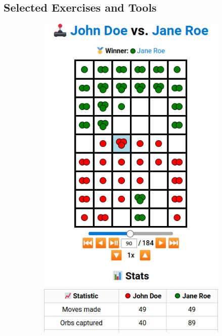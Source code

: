 \subsection{Selected Exercises and Tools}\label{sec:selected_exercises}


\begin{figure}[t!]

\centering
\begin{subfigure}[t]{0.3\textwidth}
  \centering
  \includegraphics[width=\linewidth]{img/chainreaction}

\end{subfigure}
\end{figure}

